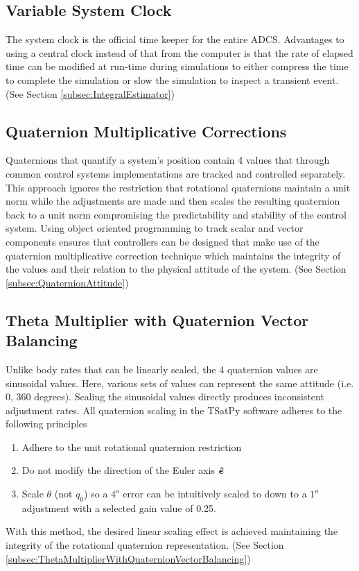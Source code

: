 \subsection{Variable System Clock}

The system clock is the official time keeper for the entire ADCS. Advantages to using a central clock instead of that from the computer is that the rate of elapsed time can be modified at run-time during simulations to either compress the time to complete the simulation or slow the simulation to inspect a transient event. (See Section \ref{subsec:IntegralEstimator})

\subsection{Quaternion Multiplicative Corrections}

Quaternions that quantify a system's position contain 4 values that through common control systems implementations are tracked and controlled separately. This approach ignores the restriction that rotational quaternions maintain a unit norm while the adjustments are made and then scales the resulting quaternion back to a unit norm compromising the predictability and stability of the control system.  Using object oriented programming to track scalar and vector components ensures that controllers can be designed that make use of the quaternion multiplicative correction technique which maintains the integrity of the values and their relation to the physical attitude of the system. (See Section \ref{subsec:QuaternionAttitude})

\subsection{Theta Multiplier with Quaternion Vector Balancing}

Unlike body rates that can be linearly scaled, the 4 quaternion values are sinusoidal values.  Here, various sets of values can represent the same attitude (i.e. 0, 360 degrees). Scaling the sinusoidal values directly produces inconsistent adjustment rates. All quaternion scaling in the TSatPy software adheres to the following principles
\begin{enumerate}
  \item Adhere to the unit rotational quaternion restriction
  \item Do not modify the direction of the Euler axis $\boldsymbol{\hat{e}}$
  \item Scale $\theta$ (not $q_0$) so a $4^o$ error can be intuitively scaled to down to a $1^o$ adjustment with a selected gain value of 0.25.
\end{enumerate}
With this method, the desired linear scaling effect is achieved maintaining the integrity of the rotational quaternion representation. (See Section \ref{subsec:ThetaMultiplierWithQuaternionVectorBalancing})

